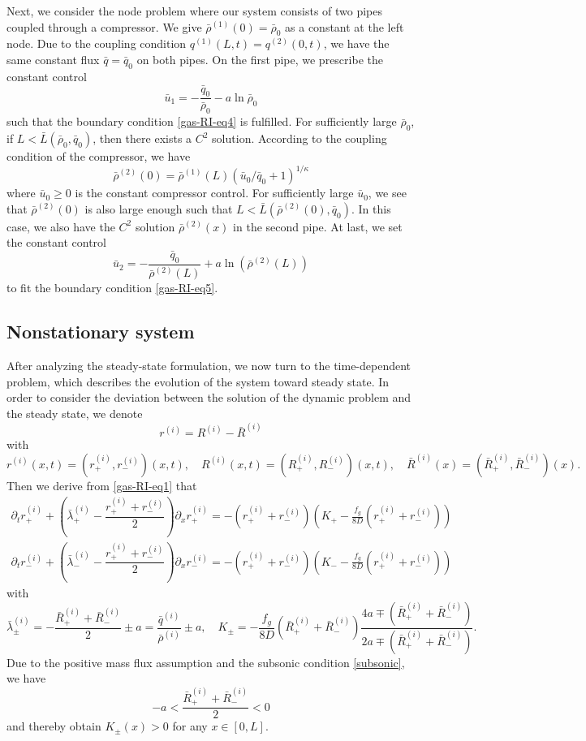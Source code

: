 \documentclass[12pt]{article}
\numberwithin{equation}{section}
\begin{document}
Next, we consider the node problem where our system consists of two pipes coupled through a compressor.
We give $\bar{\rho}^{(1)}(0)=\bar{\rho}_0$ as a constant at the left node. Due to the coupling condition $q^{(1)}(L,t)=q^{(2)}(0,t)$, we
have the same constant flux $\bar{q}=\bar{q}_0$ on both pipes. On the first pipe, we prescribe the constant control 
$$
\bar{u}_1 = -\frac{\bar{q}_0}{\bar{\rho}_0}-a\ln \bar{\rho}_0
$$
such that the boundary condition \eqref{gas-RI-eq4} is fulfilled. For sufficiently large $\bar{\rho}_0$, if $L<\bar{L}(\bar{\rho}_0,\bar{q}_0)$, then there exists a $C^2$ solution.  According to the  coupling condition of the compressor, we have $$\bar{\rho}^{(2)}(0) = \bar{\rho}^{(1)}(L) (\bar{u}_0/\bar{q}_0 + 1)^{1/\kappa}$$ where $\bar{u}_0 \geq 0$ is the constant compressor
control. For sufficiently large $\bar{u}_0$, we see that $\bar{\rho}^{(2)}(0)$ is also large enough such that $L<\bar{L}(\bar{\rho}^{(2)}(0),\bar{q}_0)$. In this case, we also have the $C^2$ solution $\bar{\rho}^{(2)}(x)$ in the second pipe. At last, we set the constant control 
$$
\bar{u}_2 = -\frac{\bar{q}_0}{\bar{\rho}^{(2)}(L)}+a\ln (\bar{\rho}^{(2)}(L))
$$
to fit the boundary condition \eqref{gas-RI-eq5}.
    


\subsection{Nonstationary system}
After analyzing the steady-state formulation, we now turn to the time-dependent problem, which describes the evolution of the system toward steady state.
In order to consider the deviation between the solution of the dynamic problem and the steady state, we denote 
$$
r^{(i)}  = R^{(i)}  - \bar{R}^{(i)} 
$$
with 
$$
r^{(i)}(x,t)=\left(r_{+}^{(i)},r_{-}^{(i)}\right)(x,t),\quad 
R^{(i)}(x,t)=\left(R_{+}^{(i)},R_{-}^{(i)}\right)(x,t),\quad 
\bar{R}^{(i)}(x)=\left(\bar{R}_{+}^{(i)},\bar{R}_{-}^{(i)}\right)(x).
$$
Then we derive from \eqref{gas-RI-eq1} that
\begin{align}
\partial_tr_+^{(i)} 
+\left(\bar{\lambda}^{(i)}_+ - \dfrac{r_+^{(i)}+r_-^{(i)}}{2}\right)\partial_xr_+^{(i)}
=-\left(r_+^{(i)}+r_-^{(i)}\right)
\left(K_+-\frac{f_g}{8D}\left(r_+^{(i)}+r_-^{(i)}\right)\right)\label{gas-r-eq1}\\[2mm]
\partial_tr_-^{(i)} 
+\left(\bar{\lambda}^{(i)}_- - \dfrac{r_+^{(i)}+r_-^{(i)}}{2}\right)\partial_xr_-^{(i)}
=-\left(r_+^{(i)}+r_-^{(i)}\right)
\left(K_--\frac{f_g}{8D}\left(r_+^{(i)}+r_-^{(i)}\right)\right)\label{gas-r-eq2}
\end{align}
with 
$$
\bar{\lambda}^{(i)}_\pm = -\frac{\bar{R}^{(i)}_++\bar{R}^{(i)}_-}{2}\pm a=\frac{\bar{q}^{(i)}}{\bar{\rho}^{(i)}}\pm a,
\quad
K_\pm = -\frac{f_g}{8D}\left(
\bar{R}_+^{(i)}+\bar{R}_-^{(i)}\right)
\frac{4a\mp
(\bar{R}_+^{(i)}+\bar{R}_-^{(i)})}{2a\mp(
\bar{R}_+^{(i)}+\bar{R}_-^{(i)})}.
$$
Due to the positive mass flux assumption and the subsonic condition \eqref{subsonic}, we have 
$$
-a<\frac{\bar{R}_+^{(i)}+\bar{R}_-^{(i)}}{2}<0
$$
and thereby obtain 
$K_\pm(x)>0$
for any $x\in [0,L]$.
\end{document}
